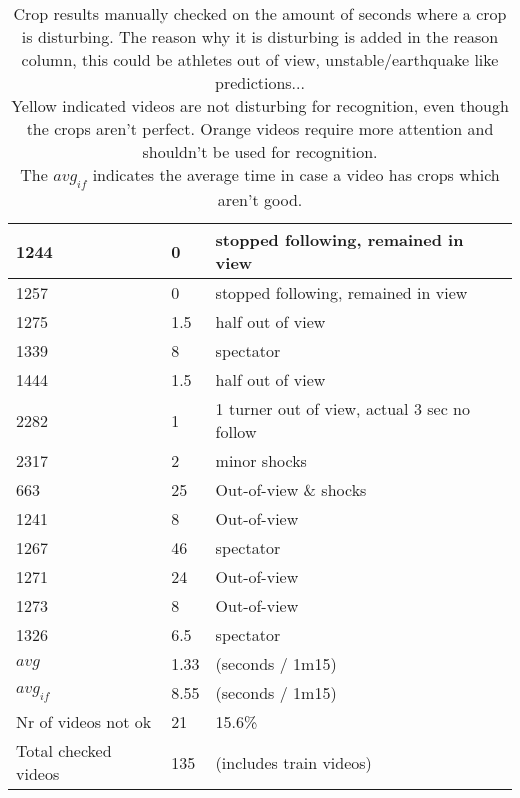 \begin{table}[h!]
\begin{tabular}{|l|l|l|}
        1244 &	\cellcolor{yellow!25} 0    &	stopped following, remained in view \\ \hline
        1257 &	\cellcolor{yellow!25} 0    &	stopped following, remained in view \\ \hline
        1275 &	\cellcolor{yellow!25} 1.5  &	half out of view \\ \hline
        1339 &	\cellcolor{yellow!25} 8    &  spectator \\ \hline
        1444 &	\cellcolor{yellow!25} 1.5  &	half out of view \\ \hline
        2282 &	\cellcolor{yellow!25} 1    &	1 turner out of view, actual 3 sec no follow \\ \hline
        2317 &	\cellcolor{yellow!25} 2    &	minor shocks \\ \hline
        663  &	\cellcolor{orange!25} 25   &	Out-of-view \& shocks \\ \hline
        1241 &	\cellcolor{orange!25} 8    &	Out-of-view \\ \hline
        1267 &	\cellcolor{orange!25} 46   &	spectator \\ \hline
        1271 &	\cellcolor{orange!25} 24   &	Out-of-view \\ \hline
        1273 &	\cellcolor{orange!25} 8    &	Out-of-view \\ \hline
        1326 &	\cellcolor{orange!25} 6.5  &	spectator \\ \hline
        \(avg\) &	1.33 &	(seconds / 1m15) \\ \hline
        \(avg_{if}\) &	8.55 &	(seconds / 1m15) \\ \hline
        Nr of videos not ok &	21	& 15.6\% \\ \hline
        Total checked videos &	135	& (includes train videos) \\ \hline
    \end{tabular}
    \caption[Manually checked crop results]{Crop results manually checked on the amount of seconds where a crop is disturbing. The reason why it is disturbing is added in the reason column, this could be athletes out of view, unstable/earthquake like predictions... \\
    Yellow indicated videos are not disturbing for recognition, even though the crops aren't perfect. Orange videos require more attention and shouldn't be used for recognition. \\
    The \(avg_{if}\) indicates the average time in case a video has crops which aren't good.}
    \label{tbl:crop-results}
\end{table}


